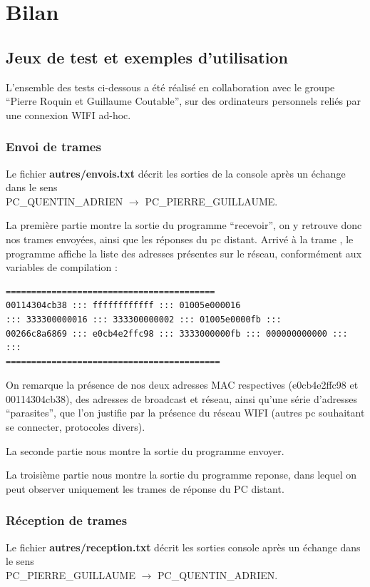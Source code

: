 \documentclass[a4paper,11pt]{article}
\begin{document}
	\section{Bilan}
	\subsection{Jeux de test et exemples d'utilisation}
	L'ensemble des tests ci-dessous a été réalisé en collaboration avec le groupe ``Pierre Roquin et Guillaume Coutable'',  sur des ordinateurs personnels reliés par une connexion WIFI ad-hoc.
	\subsubsection{Envoi de trames}
	Le fichier \textbf{autres/envois.txt} décrit les sorties de la console après un échange dans le sens \\PC\_QUENTIN\_ADRIEN $\to$ PC\_PIERRE\_GUILLAUME.
	
	La première partie montre la sortie du programme ``recevoir'', on y retrouve donc nos trames envoyées, ainsi que les réponses du pc distant.
	Arrivé à la trame , le programme affiche la liste des adresses présentes sur le réseau, conformément aux variables de compilation :
	\begin{lstlisting}
========================================= 
00114304cb38 ::: ffffffffffff ::: 01005e000016 
::: 333300000016 ::: 333300000002 ::: 01005e0000fb ::: 
00266c8a6869 ::: e0cb4e2ffc98 ::: 3333000000fb ::: 000000000000 :::  ::: 
==========================================
	\end{lstlisting}
	On remarque la présence de nos deux adresses MAC respectives (e0cb4e2ffc98 et 00114304cb38), des adresses de broadcast et réseau, ainsi qu'une série d'adresses ``parasites'', que l'on justifie par la présence du réseau WIFI (autres pc souhaitant se connecter, protocoles divers).
	
	La seconde partie nous montre la sortie du programme envoyer.
	
	La troisième partie nous montre la sortie du programme reponse, dans lequel on peut observer uniquement les trames de réponse du PC distant.
	
	\subsubsection{Réception de trames}
	Le fichier \textbf{autres/reception.txt} décrit les sorties console après un échange dans le sens \\PC\_PIERRE\_GUILLAUME $\to$ PC\_QUENTIN\_ADRIEN.
	
\end{document}
